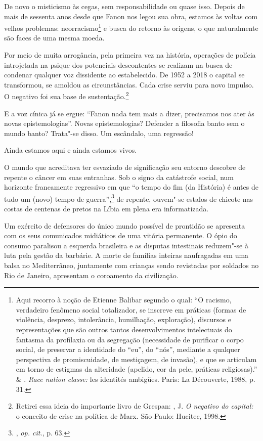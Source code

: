 De novo o misticismo às cegas, sem responsabilidade ou quase isso.
Depois de mais de sessenta anos desde que Fanon nos legou sua obra,
estamos às voltas com velhos problemas: neorracismo\footnote{Aqui
  recorro à noção de Etienne Balibar segundo o qual: ``O racismo,
  verdadeiro fenômeno social totalizador, se inscreve em práticas
  (formas de violência, desprezo, intolerância, humilhação, exploração),
  discursos e representações que são outros tantos desenvolvimentos
  intelectuais do fantasma da profilaxia ou da segregação (necessidade
  de purificar o corpo social, de preservar a identidade do ``eu'', do
  ``nós'', mediante a qualquer perspectiva de promiscuidade, de
  mestiçagem, de invasão), e que se articulam em torno de estigmas da
  alteridade (apelido, cor da pele, práticas religiosas).''  \&
  . \emph{Race nation classe:} les identités ambigües.
  Paris: La Découverte, 1988, p. 31.} e busca do retorno às origens, o
que naturalmente são faces de uma mesma moeda.

Por meio de muita arrogância, pela primeira vez na história, operações
de polícia introjetada na psique dos potenciais descontentes se realizam
na busca de condenar qualquer voz dissidente ao estabelecido. De 1952 a
2018 o capital se transformou, se amoldou as circunstâncias. Cada crise
serviu para novo impulso. O negativo foi sua base de
sustentação.\footnote{Retirei essa ideia do importante livro de Grespan:
  , J. \emph{O negativo do capital:} o conceito de crise na
  política de Marx\emph{.} São Paulo: Hucitec, 1998.}

E a voz cínica já se ergue: ``Fanon nada tem mais a dizer, precisamos
nos ater às novas epistemologias''. Novas epistemologias? Defender a
filosofia banto sem o mundo banto? Trata"-se disso. Um escândalo, uma
regressão!

Ainda estamos aqui e ainda estamos vivos.

O mundo que acreditava ter esvaziado de significação seu entorno
descobre de repente o câncer em suas entranhas. Sob o signo da
catástrofe social, num horizonte francamente regressivo em que ``o tempo
do fim (da História) é antes de tudo um (novo) tempo de
guerra'',\footnote{, \emph{op. cit.}, p. 63.} de repente, ouvem"-se
estalos de chicote nas costas de centenas de pretos na Líbia em plena
era informatizada.

Um exército de defensores do único mundo possível de prontidão se
apresenta com os seus comunicados midiáticos de uma vitória permanente.
O ópio do consumo paralisou a esquerda brasileira e as disputas
intestinais reduzem"-se à luta pela gestão da barbárie. A morte de
famílias inteiras naufragadas em uma balsa no Mediterrâneo, juntamente
com crianças sendo revistadas por soldados no Rio de Janeiro, apresentam
o coroamento da civilização.

